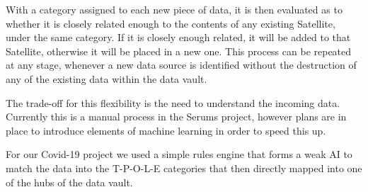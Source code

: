 With a category assigned to each new piece of data, it is then evaluated as to whether it is closely related enough to the contents of any existing Satellite, under the same category. If it is closely enough related, it will be added to that Satellite, otherwise it will be placed in a new one. This process can be repeated at any stage, whenever a new data source is identified without the destruction of any of the existing data within the data vault.

The trade-off for this flexibility is the need to understand the incoming data. Currently this is a manual process in the Serums \cite{janjic2019serums} project, however plans are in place to introduce elements of machine learning in order to speed this up.

For our Covid-19 project we used a simple rules engine that forms a weak AI to match the data into the T-P-O-L-E categories that then directly mapped into one of the hubs of the data vault.
